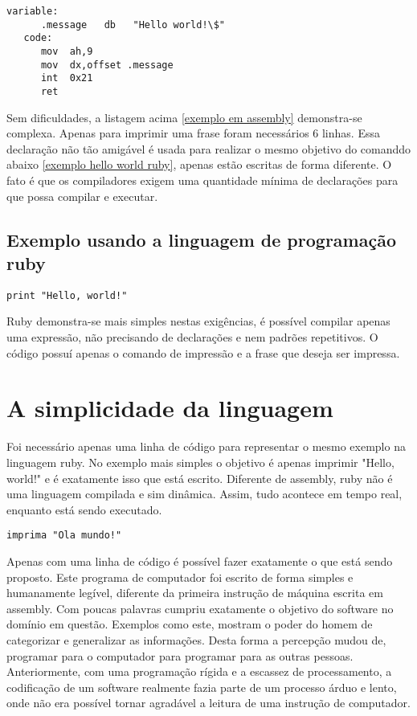 \documentclass[espaco=simples,appendix=Name]{abnt}
\begin{document}
\begin{lstlisting}[label=exemplo em assembly,caption=Exemplo em assembly]
   variable:
      .message   db   "Hello world!\$"
   code:
      mov  ah,9
      mov  dx,offset .message
      int  0x21
      ret
\end{lstlisting}

Sem dificuldades, a listagem acima \ref{exemplo em assembly} demonstra-se complexa. Apenas para imprimir uma frase foram necessários 6 linhas. Essa declaração não tão amigável é usada para realizar o mesmo objetivo do comanddo abaixo \ref{exemplo hello world ruby}, apenas estão escritas de forma diferente. O fato é que os compiladores exigem uma quantidade mínima de declarações para que possa compilar e executar.


\subsection {Exemplo usando a linguagem de programação ruby}

\begin{lstlisting}[caption=Exemplo em ruby]
   print "Hello, world!"
\end{lstlisting}

 Ruby demonstra-se mais simples nestas exigências, é possível compilar apenas uma expressão, não precisando de declarações e nem padrões repetitivos. O código possuí apenas o comando de impressão e a frase que deseja ser impressa.

\section { A simplicidade da linguagem }

Foi necessário apenas uma linha de código para representar o mesmo exemplo na linguagem ruby. No exemplo mais simples o objetivo é apenas imprimir "Hello, world!" e é exatamente isso que está escrito. Diferente de assembly, ruby não é uma linguagem compilada e sim dinâmica. Assim, tudo acontece em tempo real, enquanto está sendo executado.
   
\begin{lstlisting}[caption=Tradução do programa ruby]
   imprima "Ola mundo!"
\end{lstlisting}

Apenas com uma linha de código é possível fazer exatamente o que está sendo proposto. Este programa de computador foi escrito de forma simples e humanamente legível, diferente da primeira instrução de máquina escrita em assembly. Com poucas palavras cumpriu exatamente o objetivo do software no domínio em questão.
Exemplos como este, mostram o poder do homem de categorizar e generalizar as informações. Desta forma a percepção mudou de, programar para o computador para programar para as outras pessoas. Anteriormente, com uma programação rígida e a escassez de processamento, a codificação de um software realmente fazia parte de um processo árduo e lento, onde não era possível tornar agradável a leitura de uma instrução de computador.
\end{document}

